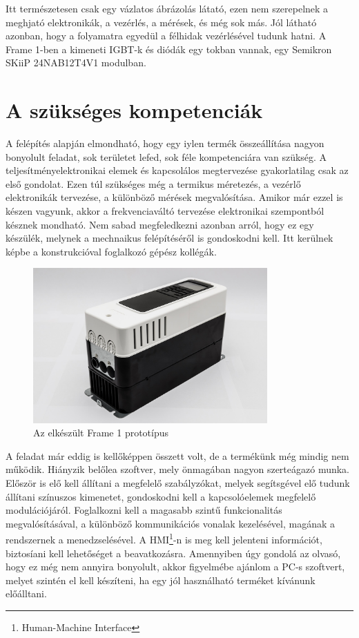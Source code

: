 Itt természetesen csak egy vázlatos ábrázolás látató, ezen nem szerepelnek a meghjató elektronikák, a vezérlés, a mérések, és még sok más. Jól látható azonban, hogy a folyamatra egyedül a félhidak vezérlésével tudunk hatni. A Frame 1-ben a kimeneti IGBT-k és diódák egy tokban vannak, egy Semikron SKiiP 24NAB12T4V1 modulban. \cite{sutozoli} \cite{ctan}

\section{A szükséges kompetenciák}

A felépítés alapján elmondható, hogy egy iylen termék összeállítása nagyon bonyolult feladat, sok területet lefed, sok féle kompetenciára van szükség. A teljesítményelektronikai elemek és kapcsolálos megtervezése gyakorlatilag csak az első gondolat. Ezen túl szükséges még a termikus méretezés, a vezérlő elektronikák tervezése, a különböző mérések megvalósítása. Amikor már ezzel is készen vagyunk, akkor a frekvenciaváltó tervezése elektronikai szempontból késznek mondható. Nem sabad megfeledkezni azonban arról, hogy ez egy készülék, melynek a mechnaikus felépítéséről is gondoskodni kell. Itt kerülnek képbe a konstrukcióval foglalkozó gépész kollégák.

\begin{figure}[h]
	\centering
	\includegraphics[width = 0.8\textwidth]{figures/n700_proto.jpg}
	\caption{Az elkészült Frame 1 prototípus} 
	\label{fig:n700_proto}
\end{figure}

A feladat már eddig is kellőképpen összett volt, de a termékünk még mindig nem működik. Hiányzik belőlea szoftver, mely önmagában nagyon szerteágazó munka. Először is elő kell állítani a megfelelő szabályzókat, melyek segítsgével elő tudunk állítani színuszos kimenetet, gondoskodni kell a kapcsolóelemek megfelelő modulációjáról. Foglalkozni kell a magasabb szintű funkcionalitás megvalósításával, a különböző kommunikációs vonalak kezelésével, magának a rendszernek a menedzselésével. A HMI\footnote{Human-Machine Interface}-n is meg kell jelenteni információt, biztosíani kell lehetőséget a beavatkozásra. Amennyiben úgy gondolá az olvasó, hogy ez még nem annyira bonyolult, akkor figyelmébe ajánlom a PC-s szoftvert, melyet szintén el kell készíteni, ha egy jól használható terméket kívánunk előálltani. 

